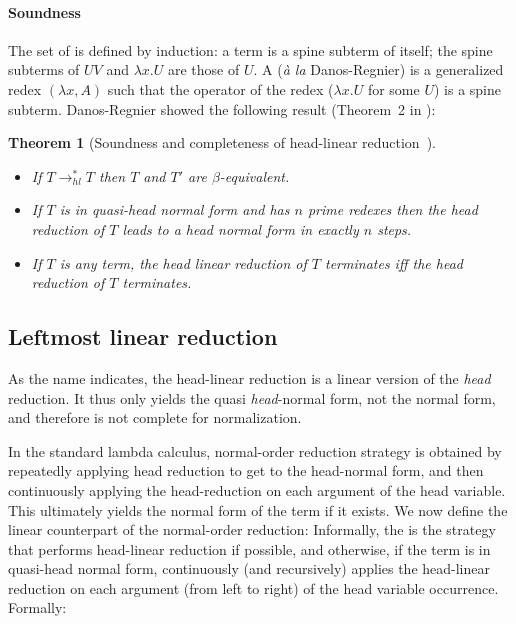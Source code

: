 \documentclass{elsarticle}
\theoremstyle{plain}
\newtheorem{theorem}{Theorem}[section]
\theoremstyle{definition}
\theoremstyle{remark}
\begin{document}
\paragraph{Soundness}
The set of  is defined by induction: a term is a spine subterm of itself; the spine subterms of $U V$ and $\lambda x. U$ are those of $U$.
A  ({\it \`a la} Danos-Regnier) is a generalized redex $(\lambda x, A)$ such that the operator of the redex ($\lambda x . U$ for some $U$) is a spine subterm. Danos-Regnier showed the following result (Theorem~2 in \cite{danos-head}):
\begin{theorem}[Soundness and completeness of head-linear reduction~\cite{danos-head}] \
\label{thm:danosregnier_headlinred}
\begin{itemize}[nosep]
\item If $T \rightarrow^*_{hl} T$  then $T$ and $T'$ are $\beta$-equivalent.
\item If $T$ is in quasi-head normal form and has $n$ prime redexes then the head reduction of $T$ leads to a head normal form in exactly $n$ steps.
\item If $T$ is any term, the head linear reduction of $T$ terminates iff the head reduction of $T$ terminates.
\end{itemize}
\end{theorem}

\subsection{Leftmost linear reduction}

As the name indicates, the head-linear reduction is a linear version of the \emph{head} reduction. It thus only yields the quasi \emph{head}-normal form, not the normal form, and therefore is not complete for normalization.

In the standard lambda calculus, normal-order reduction strategy is obtained by repeatedly applying head reduction to get to the head-normal form, and then continuously applying the head-reduction on each argument of the head variable.
This ultimately yields the normal form of the term if it exists.
We now define the linear counterpart of the normal-order reduction: Informally, the  is the strategy that performs head-linear reduction if possible, and otherwise, if the term is in quasi-head normal form, continuously (and recursively) applies the head-linear reduction on each argument (from left to right) of the head variable occurrence.
Formally:
\end{document}
